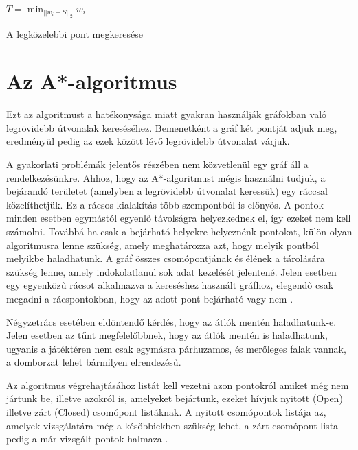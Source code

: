 \begin{algorithm}[H]
  $\displaystyle T = \min_{||w_i - S||_2} w_i$
  \caption{A legközelebbi pont megkeresése}
\end{algorithm} 

\section{Az A*-algoritmus}

Ezt az algoritmust a hatékonysága miatt gyakran használják gráfokban való legrövidebb útvonalak kereséséhez. Bemenetként a gráf két pontját adjuk meg, eredményül pedig az ezek között lévő legrövidebb útvonalat várjuk.

A gyakorlati problémák jelentős részében nem közvetlenül egy gráf áll a rendelkezésünkre. Ahhoz, hogy az A*-algoritmust mégis használni tudjuk, a bejárandó területet (amelyben a legrövidebb útvonalat keressük) egy ráccsal közelíthetjük. Ez a rácsos kialakítás több szempontból is előnyös. A pontok minden esetben egymástól egyenlő távolságra helyezkednek el, így ezeket nem kell számolni. Továbbá ha csak a bejárható helyekre helyeznénk pontokat, külön olyan algoritmusra lenne szükség, amely meghatározza azt, hogy melyik pontból melyikbe haladhatunk. A gráf összes csomópontjának és élének a tárolására szükség lenne, amely indokolatlanul sok adat kezelését jelentené. Jelen esetben egy egyenközű rácsot alkalmazva a kereséshez használt gráfhoz, elegendő csak megadni a rácspontokban, hogy az adott pont bejárható vagy nem \cite{Astar}.

Négyzetrács esetében eldöntendő kérdés, hogy az átlók mentén haladhatunk-e. Jelen esetben az tűnt megfelelőbbnek, hogy az átlók mentén is haladhatunk, ugyanis a játéktéren nem csak egymásra párhuzamos, és merőleges falak vannak, a domborzat lehet bármilyen elrendezésű.

Az algoritmus végrehajtásához listát kell vezetni azon pontokról amiket még nem jártunk be, illetve azokról is, amelyeket bejártunk, ezeket hívjuk nyitott (Open) illetve zárt (Closed) csomópont listáknak. A nyitott csomópontok listája az, amelyek vizsgálatára még a későbbiekben szükség lehet, a zárt csomópont lista pedig a már vizsgált pontok halmaza \cite{Astar2}.

